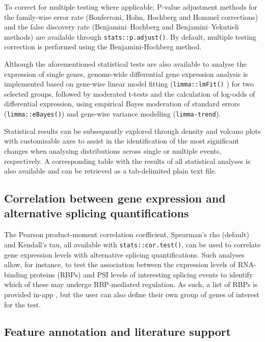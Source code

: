To correct for multiple testing where applicable, P-value adjustment methods for the family-wise error rate (Bonferroni, Holm, Hochberg and Hommel corrections) and the false discovery rate (Benjamini–Hochberg and Benjamini–Yekutieli methods) are available through \texttt{stats::p.adjust()}. By default, multiple testing correction is performed using the Benjamini-Hochberg method.

Although the aforementioned statistical tests are also available to analyse the expression of single genes, genome-wide differential gene expression analysis is implemented based on gene-wise linear model fitting (\texttt{limma::lmFit()} \cite{ritchie:2015tm}) for two selected groups, followed by moderated t-tests and the calculation of log-odds of differential expression, using empirical Bayes moderation of standard errors (\texttt{limma::eBayes()}) and gene-wise variance modelling (\texttt{limma-trend}).

Statistical results can be subsequently explored through density and volcano plots with customisable axes to assist in the identification of the most significant changes when analysing distributions across single or multiple events, respectively. A corresponding table with the results of all statistical analyses is also available and can be retrieved as a tab-delimited plain text file.

\subsection{Correlation between gene expression and alternative splicing quantifications}

The Pearson product-moment correlation coefficient, Spearman's rho (default) and Kendall's tau, all available with \texttt{stats::cor.test()}, can be used to correlate gene expression levels with alternative splicing quantifications. Such analyses allow, for instance, to test the association between the expression levels of RNA-binding proteins (RBPs) and PSI levels of interesting splicing events to identify which of these may undergo RBP-mediated regulation. As such, a list of RBPs is provided in-app \cite{sebestyen:2016tr}, but the user can also define their own group of genes of interest for the test.

\subsection{Feature annotation and literature support}


